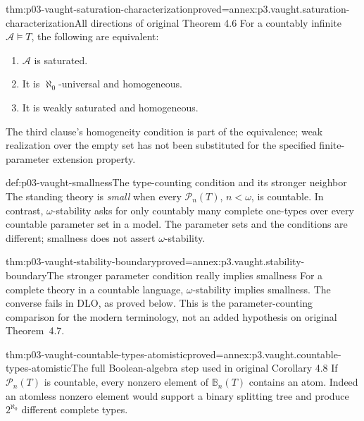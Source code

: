 \begin{hbtheorem}{thm:p03-vaught-saturation-characterization}{proved=annex:p3.vaught.saturation-characterization}{All directions of original Theorem 4.6}
For a countably infinite \(\mathcal A\models T\), the following are
equivalent:
\begin{enumerate}
\item \(\mathcal A\) is saturated.
\item It is \(\aleph_0\)-universal and homogeneous.
\item It is weakly saturated and homogeneous.
\end{enumerate}
The third clause's homogeneity condition is part of the equivalence;
weak realization over the empty set has not been substituted for
the specified finite-parameter extension property.
\end{hbtheorem}

\begin{hbdefinition}{def:p03-vaught-smallness}{The type-counting condition and its stronger neighbor}
The standing theory is \emph{small} when every \(\mathcal P_n(T)\),
\(n<\omega\), is countable. In contrast, \(\omega\)-stability asks
for only countably many complete one-types over every countable
parameter set in a model. The parameter sets and the conditions
are different; smallness does not assert \(\omega\)-stability.
\end{hbdefinition}

\begin{hblemma}{thm:p03-vaught-stability-boundary}{proved=annex:p3.vaught.stability-boundary}{The stronger parameter condition really implies smallness}
For a complete theory in a countable language, \(\omega\)-stability
implies smallness. The converse fails in DLO, as proved below.
This is the parameter-counting comparison for the modern terminology,
not an added hypothesis on original Theorem~4.7.
\end{hblemma}

\begin{hblemma}{thm:p03-vaught-countable-types-atomistic}{proved=annex:p3.vaught.countable-types-atomistic}{The full Boolean-algebra step used in original Corollary 4.8}
If \(\mathcal P_n(T)\) is countable, every nonzero element of
\(\mathbb B_n(T)\) contains an atom.
Indeed an atomless nonzero element would support a binary splitting
tree and produce \(2^{\aleph_0}\) different complete types.
\end{hblemma}

